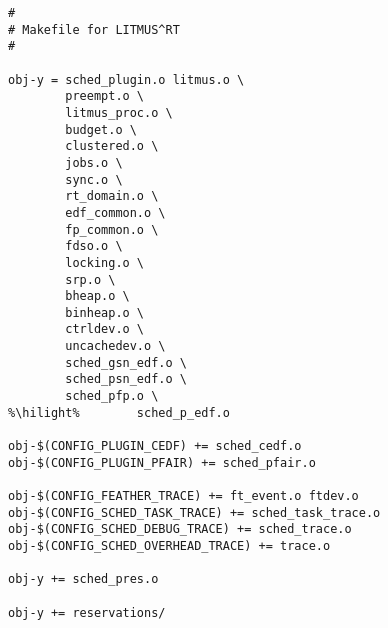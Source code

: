 \begin{lstlisting}[style=makefilestyle, escapechar=\%, caption=linux/litmus/Makefile]
#
# Makefile for LITMUS^RT
#

obj-y = sched_plugin.o litmus.o \
        preempt.o \
        litmus_proc.o \
        budget.o \
        clustered.o \
        jobs.o \
        sync.o \
        rt_domain.o \
        edf_common.o \
        fp_common.o \
        fdso.o \
        locking.o \
        srp.o \
        bheap.o \
        binheap.o \
        ctrldev.o \
        uncachedev.o \
        sched_gsn_edf.o \
        sched_psn_edf.o \
        sched_pfp.o \
%\hilight%        sched_p_edf.o

obj-$(CONFIG_PLUGIN_CEDF) += sched_cedf.o
obj-$(CONFIG_PLUGIN_PFAIR) += sched_pfair.o

obj-$(CONFIG_FEATHER_TRACE) += ft_event.o ftdev.o
obj-$(CONFIG_SCHED_TASK_TRACE) += sched_task_trace.o
obj-$(CONFIG_SCHED_DEBUG_TRACE) += sched_trace.o
obj-$(CONFIG_SCHED_OVERHEAD_TRACE) += trace.o

obj-y += sched_pres.o

obj-y += reservations/
\end{lstlisting}


